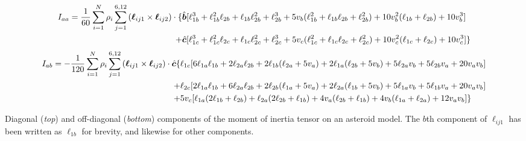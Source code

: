\documentclass[aps,twocolumn,secnumarabic,balancelastpage,amsmath,amssymb,nofootinbib,floatfix]{revtex4-1}
\begin{document}
\begin{table*} 
    \begin{equation}
        \begin{aligned}
            I_{aa} = \frac{1}{60}\sum_{i=1}^N \rho_i \sum_{j=1}^{6, 12} \left( \bm \ell_{ij1}\times \bm \ell_{ij2} \right)\cdot \{&\hat{\bm b}[\ell_{1b}^3 + \ell_{1b}^2 \ell_{2b} + \ell_{1b} \ell_{2b}^2 + \ell_{2b}^3 + 
            5 v_b (\ell_{1b}^2 + \ell_{1b} \ell_{2b} + \ell_{2b}^2) + 
            10 v_b^2 (\ell_{1b} + \ell_{2b}) + 10 v_b^3]\\
             + & \hat {\bm c}[\ell_{1c}^3 + \ell_{1c}^2 \ell_{2c} + \ell_{1c} \ell_{2c}^2 + \ell_{2c}^3 + 5 v_c (\ell_{1c}^2 + \ell_{1c} \ell_{2c} + \ell_{2c}^2) + 10 v_c^2(\ell_{1c} + \ell_{2c}) + 10 v_c^3]\}
        \end{aligned}
    \label{eqn:analytical-moi-same}
    \end{equation}
    \begin{equation}
        \begin{aligned}
            I_{ab} = -\frac{1}{120}\sum_{i=1}^N \rho_i \sum_{j=1}^{6, 12} \left( \bm \ell_{ij1}\times \bm \ell_{ij2} \right)\cdot \hat{\bm c}\{
                &\ell_{1c} [6 \ell_{1a} \ell_{1b} + 2 \ell_{2a} \ell_{2b} + 2 \ell_{1b} (\ell_{2a} + 5 v_a) + 2 \ell_{1a} (\ell_{2b} + 5 v_b) +  5 \ell_{2a} v_b + 5 \ell_{2b} v_a + 20 v_a v_b] \\
                + &\ell_{2c}[2 \ell_{1a} \ell_{1b} + 6 \ell_{2a} \ell_{2b}
                + 2 \ell_{2b}(\ell_{1a}  + 5 v_a) + 2 \ell_{2a}(\ell_{1b} + 5 v_b)
                + 5 \ell_{1a} v_b + 5 \ell_{1b}v_a + 20 v_a v_b] \\
                + &5v_c[ \ell_{1a} (2\ell_{1b} + \ell_{2b}) + \ell_{2a}(2\ell_{2b} + \ell_{1b}) + 4 v_a(\ell_{2b} + \ell_{1b}) + 4v_b(\ell_{1a} + \ell_{2a})  + 12 v_a v_b]\}
        \end{aligned}
    \label{eqn:analytical-moi-diff}
    \end{equation}
    \caption*{Diagonal (\textit{top}) and off-diagonal (\textit{bottom}) components of the moment of inertia tensor on an asteroid model. The $b$th component of $\bm \ell_{ij1}$ has been written as $\ell_{1b}$ for brevity, and likewise for other components.}
\end{table*}
\end{document}
